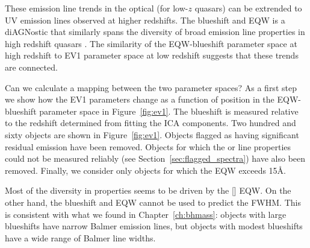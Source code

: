 These emission line trends in the optical (for low-$z$ quasars) can be extrended to UV emission lines observed at higher redshifts. 
The  blueshift and \ac{EQW} is a di\ac{AGN}ostic that similarly spans the diversity of broad emission line properties in high redshift quasars \citep[dominated by a virialized component at one extreme and a wind driven component at the other][]{richards11,sulentic07}. 
The similarity of the  \ac{EQW}-blueshift parameter space at high redshift to \ac{EV1} parameter space at low redshift suggests that these trends are connected. 

Can we calculate a mapping between the two parameter spaces? 
As a first step we show how the \ac{EV1} parameters change as a function of position in the  \ac{EQW}-blueshift parameter space in Figure~\ref{fig:ev1}. 
The  blueshift is measured relative to the redshift determined from fitting the \ac{ICA} components.
Two hundred and sixty objects are shown in Figure~\ref{fig:ev1}.
Objects flagged as having significant  residual emission have been removed.  
Objects for which the \hb or  line properties could not be measured reliably (see Section~\ref{sec:flagged_spectra}) have also been removed. 
Finally, we consider only objects for which the  EQW exceeds 15\AA. 

Most of the diversity in  properties seems to be driven by the [] \ac{EQW}. 
On the other hand, the  blueshift and \ac{EQW} cannot be used to predict the \hb FWHM. 
This is consistent with what we found in Chapter~\ref{ch:bhmass}: objects with large  blueshifts have narrow Balmer emission lines, but objects with modest  blueshifts have a wide range of Balmer line widths. 


